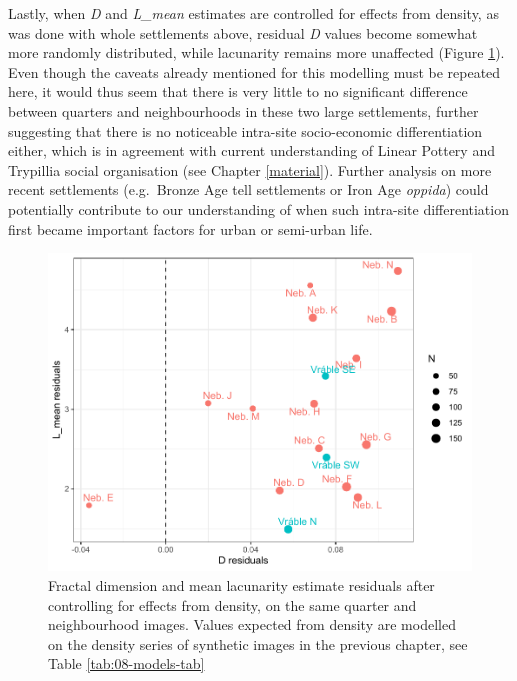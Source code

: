 \documentclass[
  12pt,
  a4paper, twoside]{book}
\begin{document}
Lastly, when \emph{D} and \emph{L\_mean} estimates are controlled for effects from density, as was done with whole settlements above, residual \emph{D} values become somewhat more randomly distributed, while lacunarity remains more unaffected (Figure \ref{fig:09-quart-resid}). Even though the caveats already mentioned for this modelling must be repeated here, it would thus seem that there is very little to no significant difference between quarters and neighbourhoods in these two large settlements, further suggesting that there is no noticeable intra-site socio-economic differentiation either, which is in agreement with current understanding of Linear Pottery and Trypillia social organisation (see Chapter \ref{material}). Further analysis on more recent settlements (e.g.~Bronze Age tell settlements or Iron Age \emph{oppida}) could potentially contribute to our understanding of when such intra-site differentiation first became important factors for urban or semi-urban life.



\begin{figure}

{\centering \includegraphics[width=0.9\linewidth]{bookdown-demo_files/figure-latex/09-quart-resid-1} 

}

\caption[D and L\_mean residuals, controlled for density, settlements]{Fractal dimension and mean lacunarity estimate residuals after controlling for effects from density, on the same quarter and neighbourhood images. Values expected from density are modelled on the density series of synthetic images in the previous chapter, see Table \ref{tab:08-models-tab}}\label{fig:09-quart-resid}
\end{figure}
\end{document}
